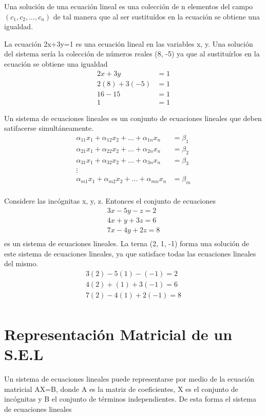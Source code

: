 Una solución de una ecuación lineal es una colección de n elementos del campo $(c_1, c_2, ..., c_n)$ de tal manera que al ser sustituídos en la ecuación se obtiene una igualdad. 
\begin{ejemplo}
La ecuación 2x+3y=1 es una ecuación lineal en las variables x, y. Una solución del sistema sería la colección de números reales (8, -5) ya que al sustituírlos en la ecuación se obtiene una igualdad
\begin{align*}
2x+3y&=1\\
2(8)+3(-5)&=1\\
16-15&=1\\
1&=1
\end{align*}
\end{ejemplo}
Un sistema de ecuaciones lineales es un conjunto de ecuaciones lineales que deben satifacerse simultáneamente.
\begin{align*}
\alpha_{11} x_1+\alpha_{12} x_2+...+\alpha_{1n} x_n&=\beta_1\\
\alpha_{21} x_1+\alpha_{22} x_2+...+\alpha_{2n} x_n&=\beta_2\\
\alpha_{31} x_1+\alpha_{32} x_2+...+\alpha_{3n} x_n&=\beta_3\\
\vdots\\
\alpha_{m1} x_1+\alpha_{m2} x_2+...+\alpha_{mn} x_n&=\beta_m\\
\end{align*} 
\begin{ejemplo}
Considere las incógnitas x, y, z. Entonces el conjunto de ecuaciones
\begin{align*}
3x-5y-z=2\\
4x+y+3z=6\\
7x-4y+2z=8\\
\end{align*}
es un sistema de ecuaciones lineales. La terna (2, 1, -1) forma una solución de este sistema de ecuaciones lineales, ya que satisface todas las ecuaciones lineales del mismo.
\begin{align*}
3(2)-5(1)-(-1)=2\\
4(2)+(1)+3(-1)=6\\
7(2)-4(1)+2(-1)=8\\
\end{align*}
\end{ejemplo}

\section{Representación Matricial de un S.E.L}
Un sistema de ecuaciones lineales puede representarse por medio de la ecuación matricial AX=B, donde A es la matriz de coeficientes, X es el conjunto de incógnitas y B el conjunto de términos independientes. De esta forma el sistema de ecuaciones lineales

